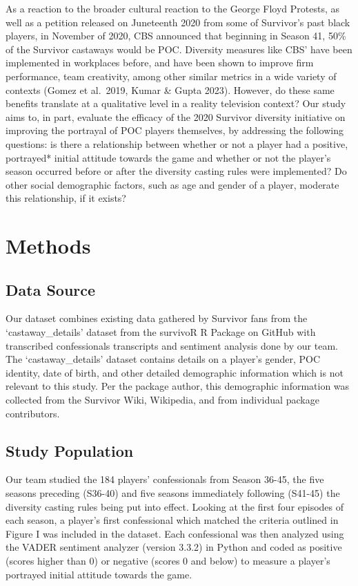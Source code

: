 \documentclass[
  letterpaper,
  DIV=11,
  numbers=noendperiod,
  oneside]{scrartcl}
\begin{document}
As a reaction to the broader cultural reaction to the George Floyd
Protests, as well as a petition released on Juneteenth 2020 from some of
Survivor's past black players, in November of 2020, CBS announced that
beginning in Season 41, 50\% of the Survivor castaways would be POC.
Diversity measures like CBS' have been implemented in workplaces before,
and have been shown to improve firm performance, team creativity, among
other similar metrics in a wide variety of contexts (Gomez et al.~2019,
Kumar \& Gupta 2023). However, do these same benefits translate at a
qualitative level in a reality television context? Our study aims to, in
part, evaluate the efficacy of the 2020 Survivor diversity initiative on
improving the portrayal of POC players themselves, by addressing the
following questions: is there a relationship between whether or not a
player had a positive, portrayed* initial attitude towards the game and
whether or not the player's season occurred before or after the
diversity casting rules were implemented? Do other social demographic
factors, such as age and gender of a player, moderate this relationship,
if it exists?

\hypertarget{methods}{%
\section{Methods}\label{methods}}

\hypertarget{data-source}{%
\subsection{Data Source}\label{data-source}}

Our dataset combines existing data gathered by Survivor fans from the
`castaway\_details' dataset from the survivoR R Package on GitHub with
transcribed confessionals transcripts and sentiment analysis done by our
team. The `castaway\_details' dataset contains details on a player's
gender, POC identity, date of birth, and other detailed demographic
information which is not relevant to this study. Per the package author,
this demographic information was collected from the Survivor Wiki,
Wikipedia, and from individual package contributors.

\hypertarget{study-population}{%
\subsection{Study Population}\label{study-population}}

Our team studied the 184 players' confessionals from Season 36-45, the
five seasons preceding (S36-40) and five seasons immediately following
(S41-45) the diversity casting rules being put into effect. Looking at
the first four episodes of each season, a player's first confessional
which matched the criteria outlined in Figure I was included in the
dataset. Each confessional was then analyzed using the VADER sentiment
analyzer (version 3.3.2) in Python and coded as positive (scores higher
than 0) or negative (scores 0 and below) to measure a player's portrayed
initial attitude towards the game.
\end{document}
